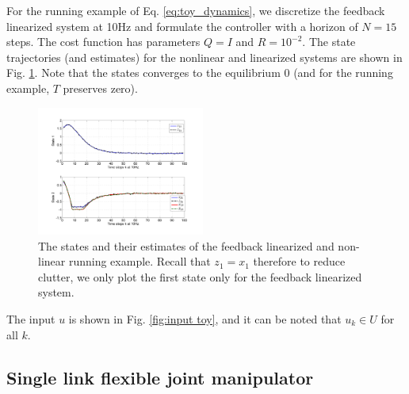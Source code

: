 For the running example of Eq. \ref{eq:toy_dynamics}, we discretize the feedback linearized system at 10Hz and formulate the controller with a horizon of $N=15$ steps. 
The cost function has parameters $Q=I$ and $R=10^{-2}$.
The state trajectories (and estimates) for the nonlinear and linearized systems are shown in Fig. \ref{fig:AllStates_toy}.
Note that the states converges to the equilibrium 0 (and for the running example, $T$ preserves zero). 

\begin{figure}
	\centering	
	\includegraphics[width=0.49\textwidth]{figs/AllStates_toy.pdf}
	\caption{The states and their estimates of the feedback linearized and non-linear running example. Recall that $z_1 = x_1$ therefore to reduce clutter, we only plot the first state only for the feedback linearized system.}
	\label{fig:AllStates_toy}
\end{figure}





The input $u$ is shown in Fig. \ref{fig:input toy}, and it can be noted that $u_k \in U$ for all $k$.

\subsection{Single link flexible joint manipulator}
\label{sec:manipulator}

